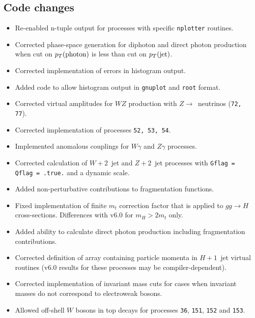 \documentclass[12pt]{article}
\begin{document}
\subsection{Code changes}
\begin{itemize}
\item Re-enabled n-tuple output for processes with specific {\tt nplotter} routines.
\item Corrected phase-space generation for diphoton and direct photon production
when cut on $p_T({\rm photon})$ is less than cut on $p_T({\rm jet})$.
\item Corrected implementation of errors in histogram output.
\item Added code to allow histogram output in {\tt gnuplot} and {\tt root} format.
\item Corrected virtual amplitudes for $WZ$ production with $Z \to $~neutrinos
({\tt 72, 77}).
\item Corrected implementation of processes {\tt 52, 53, 54}.
\item Implemented anomalous couplings for $W\gamma$ and $Z\gamma$ processes.
\item Corrected calculation of $W+2$~jet and $Z+2$~jet processes with
{\tt Gflag = Qflag = .true.} and a dynamic scale.
\item Added non-perturbative contributions to fragmentation functions.
\item Fixed implementation of finite $m_t$ correction factor that is applied to
$gg \to H$ cross-sections. Differences with v6.0 for $m_H > 2 m_t$ only.
\item Added ability to calculate direct photon production including fragmentation
contributions.
\item Corrected definition of array containing particle momenta in $H+1$~jet virtual
routines (v6.0 results for these processes may be compiler-dependent).
\item Corrected implementation of invariant mass cuts for cases when invariant
masses do not correspond to electroweak bosons.
\item Allowed off-shell $W$ bosons in top decays for processes {\tt 36},
 {\tt 151}, {\tt 152} and {\tt 153}.
\end{itemize}
\end{document}
